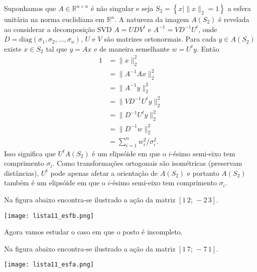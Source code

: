 \begin{questions}
\begin{solution}
        Suponhamos que $A \in \mathbb{R}^{n \times n}$ \'{e} n\~{a}o singular e seja $S_2 = \left\{ x \mid \| x \|_2 = 1 \right\}$ a esfera unit\'{a}ria na norma euclidiana em $\mathbb{R}^n$. A natureza da imagem $A(S_2)$ \'{e} revelada ao considerar a decomposi\c{c}\~{a}o SVD $A = U D V^t$ e $A^{-1} = V D^{-1} U^t$, onde $D = \mathrm{diag}(\sigma_1, \sigma_2, \ldots, \sigma_n)$, $U$ e $V$ s\~{a}o matrizes ortonormais. Para cada $y \in A(S_2)$ existe $x \in S_2$ tal que $y = A x$ e de maneira semelhante $w = U^t y$. Ent\~{a}o
        \begin{align*}
            1 &= \| x \|_2^2 \\
            &= \| A^{-1} A x \|_2^2 \\
            &= \| A^{-1} y \|_2^2 \\
            &= \| V D^{-1} U^t y \|_2^2 \\
            &= \| D^{-1} U^t y \|_2^2 \\
            &= \| D^{-1} w \|_2^2 \\
            &= \sum_{i = 1}^n w_i^2 / \sigma_i^2.
        \end{align*}
        Isso significa que $U^t A(S_2)$ \'{e} um elips\'{o}ide em que o $i$-\'{e}simo semi-eixo tem comprimento $\sigma_i$. Como transforma\c{c}\~{o}es ortogonais s\~{a}o isom\'{e}tricas (preservam dist\^{a}ncias), $U^t$ pode apenas afetar a orienta\c{c}\~{a}o de $A(S_2)$ e portanto $A(S_2)$ tamb\'{e}m \'{e} um elips\'{o}ide em que o $i$-\'{e}simo semi-eixo tem comprimento $\sigma_i$.

        Na figura abaixo encontra-se ilustrado a a\c{c}\~{a}o da matriz $[1 \, 2; \, -2 \, 3]$.
        \begin{center}
            \texttt{[image: lista11\_esfb.png]}
        \end{center}

        Agora vamos estudar o caso em que o posto \'{e} incompleto.

        Na figura abaixo encontra-se ilustrado a a\c{c}\~{a}o da matriz $[1 \, 7; \, -7 \, 1]$.
        \begin{center}
            \texttt{[image: lista11\_esfa.png]}
        \end{center}
    \end{solution}


\end{questions}
